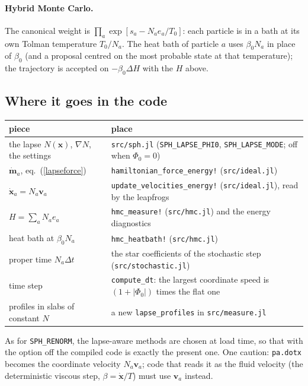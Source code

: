 \documentclass[11pt,aps,preprint,nofootinbib,superscriptaddress,tightenlines]{revtex4-2}
\def\Eq#1{eq.~(\ref{#1})}
\let\oldparagraph\paragraph
\renewcommand{\paragraph}{\par\bigskip\oldparagraph}
\begin{document}
\paragraph{Hybrid Monte Carlo.}  The canonical weight is $\prod_a\exp[s_a-N_ae_a/T_0]$: each particle is in a bath at its own Tolman temperature $T_0/N_a$.  The heat
bath of particle $a$ uses $\beta_0N_a$ in place of $\beta_0$ (and a proposal centred on the most probable state at that temperature); the trajectory is accepted on
$-\beta_0\Delta H$ with the $H$ above.

\subsection{Where it goes in the code}
\label{sec:impl_code}

\begin{center}
\small
\begin{tabular}{p{}p{}}
\toprule
piece & place \\
\midrule
the lapse $N(\bm x)$, $\nabla N$, the settings & \texttt{src/sph.jl} (\texttt{SPH\_LAPSE\_PHI0}, \texttt{SPH\_LAPSE\_MODE}; off when $\Phi_0=0$) \\
$\dot{\bm m}_a$, \Eq{lapseforce} & \texttt{hamiltonian\_force\_energy!} (\texttt{src/ideal.jl}) \\
$\dot{\bm x}_a=N_a\bm v_a$ & \texttt{update\_velocities\_energy!} (\texttt{src/ideal.jl}), read by the leapfrogs \\
$H=\sum_aN_ae_a$ & \texttt{hmc\_measure!} (\texttt{src/hmc.jl}) and the energy diagnostics \\
heat bath at $\beta_0N_a$ & \texttt{hmc\_heatbath!} (\texttt{src/hmc.jl}) \\
proper time $N_a\Delta t$ & the star coefficients of the stochastic step (\texttt{src/stochastic.jl}) \\
time step & \texttt{compute\_dt}: the largest coordinate speed is $(1+|\Phi_0|)$ times the flat one \\
profiles in slabs of constant $N$ & a new \texttt{lapse\_profiles} in \texttt{src/measure.jl} \\
\bottomrule
\end{tabular}
\end{center}
As for \texttt{SPH\_RENORM}, the lapse-aware methods are chosen at load time, so that with the option off the compiled code is exactly the present one.  One caution:
\texttt{pa.dotx} becomes the coordinate velocity $N_a\bm v_a$; code that reads it as the fluid velocity (the deterministic viscous step, $\beta=\dot{\bm x}/T$) must use
$\bm v_a$ instead.
\end{document}

